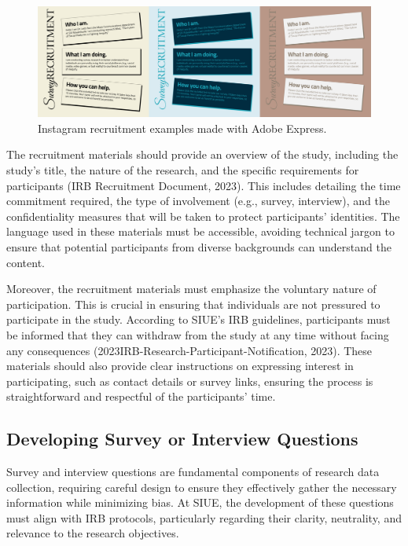 \documentclass[
]{book}
\begin{document}
\begin{figure}
\centering
\includegraphics[width=1\linewidth,height=\textheight,keepaspectratio]{images/recruit-ad.png}
\caption{Instagram recruitment examples made with Adobe Express.}
\end{figure}

The recruitment materials should provide an overview of the study, including the study's title, the nature of the research, and the specific requirements for participants (IRB Recruitment Document, 2023). This includes detailing the time commitment required, the type of involvement (e.g., survey, interview), and the confidentiality measures that will be taken to protect participants' identities. The language used in these materials must be accessible, avoiding technical jargon to ensure that potential participants from diverse backgrounds can understand the content.

Moreover, the recruitment materials must emphasize the voluntary nature of participation. This is crucial in ensuring that individuals are not pressured to participate in the study. According to SIUE's IRB guidelines, participants must be informed that they can withdraw from the study at any time without facing any consequences (2023IRB-Research-Participant-Notification, 2023). These materials should also provide clear instructions on expressing interest in participating, such as contact details or survey links, ensuring the process is straightforward and respectful of the participants' time.

\subsection*{Developing Survey or Interview Questions}\label{developing-survey-or-interview-questions}

Survey and interview questions are fundamental components of research data collection, requiring careful design to ensure they effectively gather the necessary information while minimizing bias. At SIUE, the development of these questions must align with IRB protocols, particularly regarding their clarity, neutrality, and relevance to the research objectives.
\end{document}
